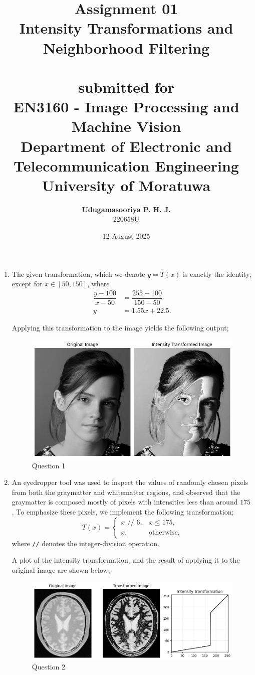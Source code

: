 \documentclass{article}[a4paper]
\title{
	\huge{\textbf{
		Assignment 01
	}}\\
	\Large{
		Intensity Transformations and Neighborhood Filtering
	}\\
	\phantom{}\\
	\large{
		submitted for
	}\\
	\LARGE{
		\textbf{EN3160 - Image Processing and Machine Vision}
	}\\
	\large{
		Department of Electronic and Telecommunication Engineering
	}
	\\
	\large{University of Moratuwa}
}
\author{
	\textbf{Udugamasooriya P. H. J.}\\
	220658U\\
}
\date{12 August 2025}
\begin{document}
\maketitle

\begin{enumerate}
	\item The given transformation, which we denote $y=T(x)$ is exactly the identity, except for $x\in [50, 150]$, where
	\begin{align*}
		\dfrac{y - 100}{x - 50} &= \dfrac{255 - 100}{150 - 50} \\
		y &= 1.55x + 22.5.
	\end{align*}

	Applying this transformation to the image yields the following output;
	\begin{figure}[H]
		\centering
		\includegraphics[width=0.6\linewidth]{images/q1.png}
		\caption{Question 1}
	\end{figure}

	\item An eyedropper tool was used to inspect the values of randomly chosen pixels from both the graymatter and whitematter regions, and observed that
	the graymatter is composed mostly of pixels with intensities less than around $175$. To emphasize these pixels, we implement the following
	transformation; \[
		T(x) = 
		\begin{cases}
			x \texttt{ // } 6, & x \leq 175,		\\
			x,		& \text{otherwise},
		\end{cases}
	\] where \texttt{//} denotes the integer-division operation.
	
	A plot of the intensity transformation, and the result of applying it to the original image are shown below;
	\begin{figure}[H]
		\centering
		\includegraphics[width=0.9\linewidth]{images/q2.png}
		\caption{Question 2}
	\end{figure}


\end{enumerate}
\end{document}
